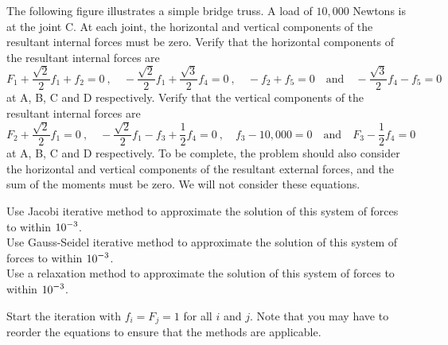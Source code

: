\begin{question}
The following figure illustrates a simple bridge truss.
A load of $10,000$ Newtons is at the joint C.  At each
joint, the horizontal and vertical components of the resultant
internal forces must be zero.  Verify that the horizontal components
of the resultant internal forces are
\[
F_1 + \frac{\sqrt{2}}{2} f_1 + f_2 = 0  \ , \quad
-\frac{\sqrt{2}}{2} f_1 + \frac{\sqrt{3}}{2} f_4  = 0 \ , \quad 
-f_2 + f_5 = 0 \quad \text{and} \quad -\frac{\sqrt{3}}{2} f_4 - f_5 = 0
\]
at A, B, C and D respectively.
Verify that the vertical components of the resultant internal forces are
\[
F_2 + \frac{\sqrt{2}}{2} f_1 = 0 \ , \quad
-\frac{\sqrt{2}}{2} f_1 - f_3 + \frac{1}{2} f_4 = 0 \ , \quad
f_3 - 10,000 = 0 \quad \text{and} \quad
F_3 - \frac{1}{2} f_4 =0
\]
at A, B, C and D respectively.  To be complete, the problem should
also consider the horizontal and vertical components of the resultant
external forces, and the sum of the moments must be zero.  We will not
consider these equations.

 Use Jacobi iterative method to approximate the solution of this
system of forces to within $\displaystyle 10^{-3}$.\\
 Use Gauss-Seidel iterative method to approximate the solution of this
system of forces to within $\displaystyle 10^{-3}$.\\
 Use a relaxation method to approximate the solution of this system
of forces to within $\displaystyle 10^{-3}$.

Start the iteration with $f_i= F_j = 1$ for all $i$ and $j$.
Note that you may have to reorder the equations to ensure that the
methods are applicable.
\end{question}

